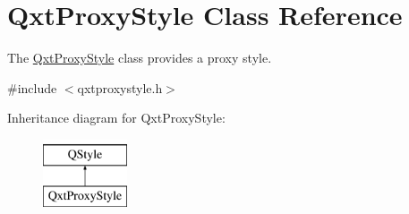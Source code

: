 \hypertarget{class_qxt_proxy_style}{\section{Qxt\-Proxy\-Style Class Reference}
\label{class_qxt_proxy_style}
}


The \hyperlink{class_qxt_proxy_style}{Qxt\-Proxy\-Style} class provides a proxy style.  




{\ttfamily \#include $<$qxtproxystyle.\-h$>$}

Inheritance diagram for Qxt\-Proxy\-Style\-:\begin{figure}[H]
\begin{center}
\leavevmode
\includegraphics[height=2.000000cm]{class_qxt_proxy_style}
\end{center}
\end{figure}
